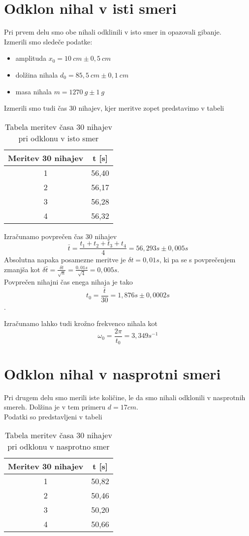 \documentclass[a4paper]{report}
\begin{document}
\section*{Odklon nihal v isti smeri}
Pri prvem delu smo obe nihali odklinili v isto smer in opazovali gibanje.\\
Izmerili smo sledeče podatke:\\
\begin{itemize}
    \item amplituda $x_0 = 10 \ cm \pm 0,5 \ cm$
    \item dolžina nihala $d_0= 85,5 \ cm \pm 0,1 \ cm$
    \item masa nihala $m=1270 \ g \pm 1\ g$
\end{itemize}


Izmerili smo tudi čas 30 nihajev, kjer meritve zopet predstavimo v tabeli
\begin{table}[H]
    \centering
    \begin{tabular}{|c|c|}
         Meritev 30 nihajev& t [s]  \\
         \hline
         1&56,40 \\
         2&56,17\\
         3&56,28\\
         4& 56,32\\
    \end{tabular}
    \caption{Tabela meritev časa 30 nihajev pri odklonu v isto smer}
    \label{tab:my_label}
\end{table}
Izračunamo povprečen čas 30 nihajev
$$ \bar{t} = \frac{t_1+t_2+t_3+t_4}{4} = 56,293 s \pm 0,005 s
$$
Absolutna napaka posamezne meritve je $\delta t = 0,01 s$, ki pa se s povprečenjem zmanjša kot $\delta \bar{t} = \frac{\delta t}{\sqrt{n}} = \frac{0,01 s}{\sqrt{4}} = 0,005 s$.\\

Povprečen nihajni čas enega nihaja je tako $$t_0 = \frac{\bar{t}}{30} = 1,876 s \pm 0,0002 s$$.

Izračunamo lahko tudi krožno frekvenco nihala kot $$\omega_0 = \frac{2\pi}{t_0} = 3,349 s^{-1}$$

\section*{Odklon nihal v nasprotni smeri}

Pri drugem delu smo merili iste količine, le da smo nihali odklonili v nasprotnih smereh. Dolžina je v tem primeru $d=17 cm $.\\
Podatki so predstavljeni v tabeli
\begin{table}[H]
    \centering
    \begin{tabular}{|c|c|}
    Meritev 30 nihajev&t [s]\\
    \hline
         1& 50,82 \\
         2& 50,46\\
         3&50,20\\
         4&50,66\\
    \end{tabular}
    \caption{Tabela meritev časa 30 nihajev pri odklonu v nasprotno smer}
    \label{tab:my_label}
\end{table}
\end{document}
